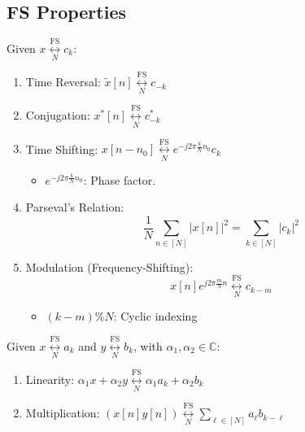 \documentclass{article}
\begin{document}
\begin{paracol}{2}
\subsection{FS Properties}
\begin{definition}
    Given \( x \underset{N}{\overset{\text{FS}}{\longleftrightarrow}} c_k \):
    \begin{enumerate}
        \item Time Reversal: \( \tilde{x}[n] \underset{N}{\overset{\text{FS}}{\longleftrightarrow}} c_{-k} \)
        \item Conjugation: \( x^*[n] \underset{N}{\overset{\text{FS}}{\longleftrightarrow}} c^*_{-k} \)
        \item Time Shifting: \( x[n - n_0] \underset{N}{\overset{\text{FS}}{\longleftrightarrow}} e^{-j2\pi \frac{k}{N} n_0} c_k \)
        \begin{itemize}
            \item \( e^{-j2\pi \frac{k}{N} n_0} \): Phase factor.
        \end{itemize}
        \item Parseval's Relation: 
        \begin{equation*}
            \frac{1}{N} \sum_{n \in [N]} |x[n]|^2 = \sum_{k \in [N]} |c_k|^2
        \end{equation*}
        \item Modulation (Frequency-Shifting): 
        \begin{equation*}
            x[n] e^{j2\pi \frac{m}{N} n} \underset{N}{\overset{\text{FS}}{\longleftrightarrow}} c_{k-m}
        \end{equation*}
        \begin{itemize}
            \item \( (k - m)\%N \): Cyclic indexing
        \end{itemize}
    \end{enumerate}
    \vspace{1em}

        Given \( x \underset{N}{\overset{\text{FS}}{\longleftrightarrow}} a_k \) and \( y \underset{N}{\overset{\text{FS}}{\longleftrightarrow}} b_k \), with \( \alpha_1, \alpha_2 \in \mathbb{C} \):
    \begin{enumerate}
        \item Linearity: \( \alpha_1 x + \alpha_2 y \underset{N}{\overset{\text{FS}}{\longleftrightarrow}} \alpha_1 a_k + \alpha_2 b_k \)
        \item Multiplication: \( (x[n] y[n]) \underset{N}{\overset{\text{FS}}{\longleftrightarrow}} \sum_{\ell \in [N]} a_\ell b_{k - \ell} \)
    \end{enumerate}
\end{definition}


\end{paracol}
\end{document}
